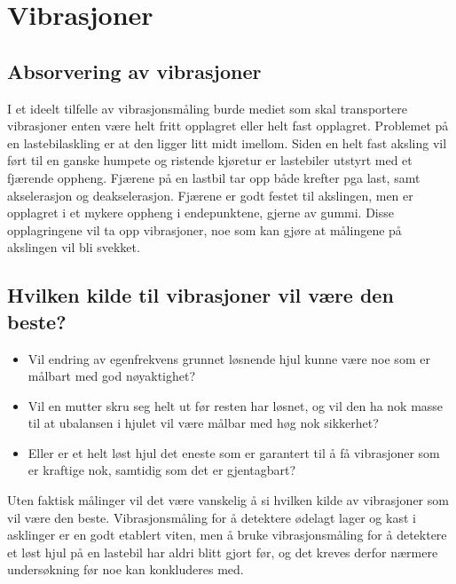 \section{Vibrasjoner}
\subsection{Absorvering av vibrasjoner}
I et ideelt tilfelle av vibrasjonsmåling burde mediet som skal transportere vibrasjoner 
enten være helt fritt opplagret eller helt fast opplagret. Problemet på en lastebilaskling 
er at den ligger litt midt imellom. Siden en helt fast aksling vil ført til en ganske humpete 
og ristende kjøretur er lastebiler utstyrt med et fjærende oppheng. Fjærene på en lastbil
 tar opp både krefter pga last, samt akselerasjon og deakselerasjon. Fjærene er godt 
festet til akslingen, men er opplagret i et mykere oppheng i endepunktene, gjerne av gummi. 
Disse opplagringene vil ta opp vibrasjoner, noe som kan gjøre at målingene på akslingen vil bli svekket.

\subsection{Hvilken kilde til vibrasjoner vil være den beste?}
\begin{itemize}
	\item Vil endring av egenfrekvens grunnet løsnende hjul kunne være noe som er 
målbart med god nøyaktighet?
	\item Vil en mutter skru seg helt ut før resten har
 løsnet, og vil den ha nok masse til at ubalansen i hjulet vil være målbar med 
høg nok sikkerhet? 
	\item Eller er et helt løst hjul det eneste som er garantert til å få 
vibrasjoner som er kraftige nok, samtidig som det er gjentagbart?
\end{itemize}
Uten faktisk målinger vil det være vanskelig å si hvilken kilde av vibrasjoner 
som vil være den beste. Vibrasjonsmåling for å detektere ødelagt lager og 
kast i asklinger er en godt etablert viten, men å bruke vibrasjonsmåling for 
å detektere et løst hjul på en lastebil har aldri blitt gjort før, og det kreves 
derfor nærmere undersøkning før noe kan konkluderes med. 
